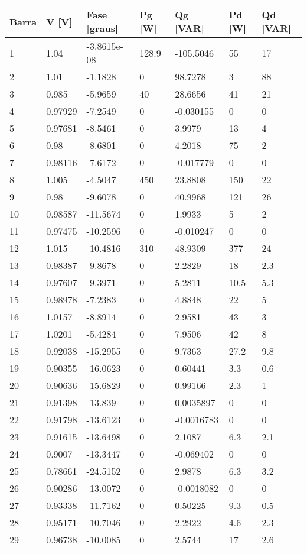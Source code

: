 \begin{tabular}{|l|l|l|l|l|l|l|}
\hline
\textbf{Barra}&\textbf{V [V]}&\textbf{Fase [graus]}&\textbf{Pg [W]}&\textbf{Qg [VAR]}&\textbf{Pd [W]}&\textbf{Qd [VAR]}\\\hline
1&1.04&-3.8615e-08&128.9&-105.5046&55&17\\\hline
2&1.01&-1.1828&0&98.7278&3&88\\\hline
3&0.985&-5.9659&40&28.6656&41&21\\\hline
4&0.97929&-7.2549&0&-0.030155&0&0\\\hline
5&0.97681&-8.5461&0&3.9979&13&4\\\hline
6&0.98&-8.6801&0&4.2018&75&2\\\hline
7&0.98116&-7.6172&0&-0.017779&0&0\\\hline
8&1.005&-4.5047&450&23.8808&150&22\\\hline
9&0.98&-9.6078&0&40.9968&121&26\\\hline
10&0.98587&-11.5674&0&1.9933&5&2\\\hline
11&0.97475&-10.2596&0&-0.010247&0&0\\\hline
12&1.015&-10.4816&310&48.9309&377&24\\\hline
13&0.98387&-9.8678&0&2.2829&18&2.3\\\hline
14&0.97607&-9.3971&0&5.2811&10.5&5.3\\\hline
15&0.98978&-7.2383&0&4.8848&22&5\\\hline
16&1.0157&-8.8914&0&2.9581&43&3\\\hline
17&1.0201&-5.4284&0&7.9506&42&8\\\hline
18&0.92038&-15.2955&0&9.7363&27.2&9.8\\\hline
19&0.90355&-16.0623&0&0.60441&3.3&0.6\\\hline
20&0.90636&-15.6829&0&0.99166&2.3&1\\\hline
21&0.91398&-13.839&0&0.0035897&0&0\\\hline
22&0.91798&-13.6123&0&-0.0016783&0&0\\\hline
23&0.91615&-13.6498&0&2.1087&6.3&2.1\\\hline
24&0.9007&-13.3447&0&-0.069402&0&0\\\hline
25&0.78661&-24.5152&0&2.9878&6.3&3.2\\\hline
26&0.90286&-13.0072&0&-0.0018082&0&0\\\hline
27&0.93338&-11.7162&0&0.50225&9.3&0.5\\\hline
28&0.95171&-10.7046&0&2.2922&4.6&2.3\\\hline
29&0.96738&-10.0085&0&2.5744&17&2.6\\\hline

\end{tabular}
